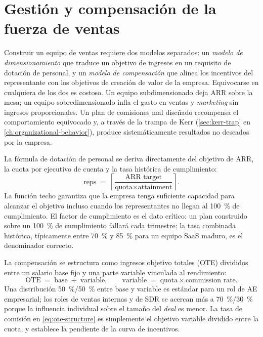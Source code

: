 \section{Gestión y compensación de la fuerza de ventas}\label{sec:salesforce-management}

Construir un equipo de ventas requiere dos modelos separados: un \textit{modelo de
dimensionamiento} que traduce un objetivo de ingresos en un requisito de dotación de personal, y
un \textit{modelo de compensación} que alinea los incentivos del representante con los objetivos
de creación de valor de la empresa. Equivocarse en cualquiera de los dos es costoso. Un equipo
subdimensionado deja ARR sobre la mesa; un equipo sobredimensionado infla el gasto en ventas y
\emph{marketing} sin ingresos proporcionales. Un plan de comisiones mal diseñado recompensa el
comportamiento equivocado y, a través de la trampa de Kerr (\cref{sec:kerr-trap} en
\cref{ch:organizational-behavior}), produce sistemáticamente resultados no deseados por la empresa.

La fórmula de dotación de personal se deriva directamente del objetivo de ARR, la cuota por
ejecutivo de cuenta y la tasa histórica de cumplimiento:
\begin{equation}\label{eq:sales-productivity}
  \text{reps} \;=\;
    \left\lceil\frac{\text{ARR target}}{\text{quota}\times\text{attainment}}\right\rceil.
\end{equation}
La función techo garantiza que la empresa tenga suficiente capacidad para alcanzar el objetivo
incluso cuando los representantes no llegan al \qty{100}{\percent} de cumplimiento. El factor de
cumplimiento es el dato crítico: un plan construido sobre un \qty{100}{\percent} de cumplimiento
fallará cada trimestre; la tasa combinada histórica, típicamente entre \qty{70}{\percent} y
\qty{85}{\percent} para un equipo SaaS maduro, es el denominador correcto.

La compensación se estructura como ingresos objetivo totales (OTE) divididos entre un salario
base fijo y una parte variable vinculada al rendimiento:
\begin{equation}\label{eq:ote-structure}
  \text{OTE} \;=\; \text{base} \;+\; \text{variable}, \qquad
  \text{variable} \;=\; \text{quota} \times \text{commission rate}.
\end{equation}
Una distribución \qty{50}{\percent}/\qty{50}{\percent} entre base y variable es estándar para un
rol de AE empresarial; los roles de ventas internas y de SDR se acercan más a
\qty{70}{\percent}/\qty{30}{\percent} porque la influencia individual sobre el tamaño del
\emph{deal} es menor. La tasa de comisión en \cref{eq:ote-structure} es simplemente el objetivo
variable dividido entre la cuota, y establece la pendiente de la curva de incentivos.

